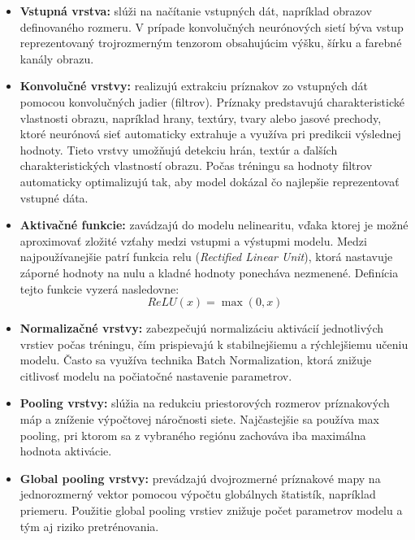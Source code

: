 \begin{itemize}
    \item \textbf{Vstupná vrstva:} slúži na načítanie vstupných dát, napríklad obrazov definovaného rozmeru. V prípade konvolučných neurónových sietí býva vstup reprezentovaný trojrozmerným tenzorom obsahujúcim výšku, šírku a farebné kanály obrazu.

    \item \textbf{Konvolučné vrstvy:} realizujú extrakciu príznakov zo vstupných dát pomocou konvolučných jadier (filtrov). 
    Príznaky predstavujú charakteristické vlastnosti obrazu, napríklad hrany, textúry, tvary alebo jasové prechody, ktoré neurónová sieť automaticky extrahuje a využíva pri predikcii výslednej hodnoty.
    Tieto vrstvy umožňujú detekciu hrán, textúr a ďalších charakteristických vlastností obrazu. Počas tréningu sa hodnoty filtrov automaticky optimalizujú tak, aby model dokázal čo najlepšie reprezentovať vstupné dáta.

    \item \textbf{Aktivačné funkcie:} zavádzajú do modelu nelinearitu, vďaka ktorej je možné aproximovať zložité 
    vzťahy medzi vstupmi a výstupmi modelu. Medzi najpoužívanejšie patrí funkcia \acrshort{relu} 
    (\textit{Rectified Linear Unit}), ktorá nastavuje záporné hodnoty na nulu a kladné hodnoty ponecháva nezmenené. 
    Definícia tejto funkcie vyzerá nasledovne:
    \begin{equation*}
        ReLU(x)=\max(0,x)
    \end{equation*}

    \item \textbf{Normalizačné vrstvy:} zabezpečujú normalizáciu aktivácií jednotlivých vrstiev 
    počas tréningu, čím prispievajú k stabilnejšiemu a rýchlejšiemu učeniu modelu. Často sa využíva 
    technika Batch Normalization, ktorá znižuje citlivosť modelu na počiatočné nastavenie parametrov.

    \item \textbf{Pooling vrstvy:} slúžia na redukciu priestorových rozmerov príznakových máp a zníženie výpočtovej náročnosti siete. Najčastejšie sa používa max pooling, pri ktorom sa z vybraného regiónu zachováva iba maximálna hodnota aktivácie.

    \item \textbf{Global pooling vrstvy:} prevádzajú dvojrozmerné príznakové mapy na jednorozmerný vektor pomocou výpočtu globálnych štatistík, napríklad priemeru. Použitie global pooling vrstiev znižuje počet parametrov modelu a tým aj riziko pretrénovania.


\end{itemize}
